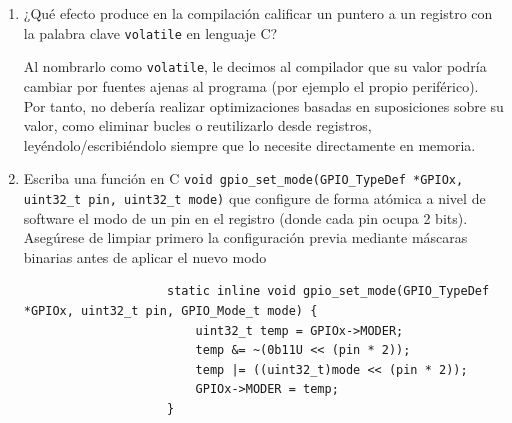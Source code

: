 \documentclass[svgnames,spanish,11pt,a4paper]{article}
\newcounter{solution}
\begin{document}
\begin{enumerate}
            \begin{solution}
                \begin{lstlisting}
                    #define CRC_BASE_ADDR 0x40023000

                    typedef struct
                    {
                        volatile uint32_t DR;
                        volatile uint32_t IDR;
                        volatile uint32_t CR;
                        volatile uint32_t INIT;
                        volatile uint32_t POL;
                    } CRC_TypeDef;

                    #define CRC ((CRC_TypeDef *) CRC_BASE_ADDR)

                    static inline void CRC_SET() {
                        //        REV_OUT    REV_IN     POLYSIZE      RESET
                        CRC->CR = (0 << 7) | (0 << 5) | (0b10 << 3) | (1);
                    }   
                \end{lstlisting}
            \end{solution}
                

        \item ¿Qué efecto produce en la compilación calificar un puntero a un registro con la palabra clave \lstinline|volatile| en lenguaje C?

            \begin{solution}
                Al nombrarlo como \lstinline|volatile|, le decimos al compilador que su valor podría cambiar por fuentes ajenas al programa (por ejemplo el propio periférico). Por tanto, no debería realizar optimizaciones basadas en suposiciones sobre su valor, como eliminar bucles o reutilizarlo desde registros, leyéndolo/escribiéndolo siempre que lo necesite directamente en memoria.
            \end{solution}

        \item Escriba una función en C \lstinline|void gpio_set_mode(GPIO_TypeDef *GPIOx, uint32_t pin, uint32_t mode)| que configure de forma atómica a nivel de software el modo de un pin en el registro  (donde cada pin ocupa 2 bits). Asegúrese de limpiar primero la configuración previa mediante máscaras binarias antes de aplicar el nuevo modo
        
            \begin{solution}
                \begin{lstlisting}
                    static inline void gpio_set_mode(GPIO_TypeDef *GPIOx, uint32_t pin, GPIO_Mode_t mode) {
                        uint32_t temp = GPIOx->MODER;
                        temp &= ~(0b11U << (pin * 2));
                        temp |= ((uint32_t)mode << (pin * 2));
                        GPIOx->MODER = temp;
                    }
                \end{lstlisting}
            \end{solution}


\end{enumerate}
\end{document}
